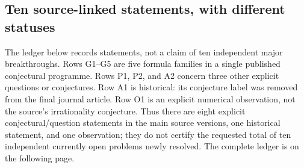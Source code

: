 \documentclass[11pt,a4paper]{article}
\theoremstyle{definition}
\theoremstyle{remark}
\numberwithin{equation}{section}
\begin{document}
\subsection{Ten source-linked statements, with different statuses}
The ledger below records statements, not a claim of ten independent
major breakthroughs. Rows G1--G5 are five formula families in a single
published conjectural programme. Rows P1, P2, and A2 concern three other
explicit questions or conjectures. Row A1 is historical: its conjecture
label was removed from the final journal article. Row O1 is an explicit
numerical observation, not the source's irrationality conjecture.
Thus there are eight explicit conjectural/question statements in the
main source versions, one historical statement, and one observation;
they do not certify the requested total of ten independent currently
open problems newly resolved. The complete ledger is on the following page.
\end{document}
